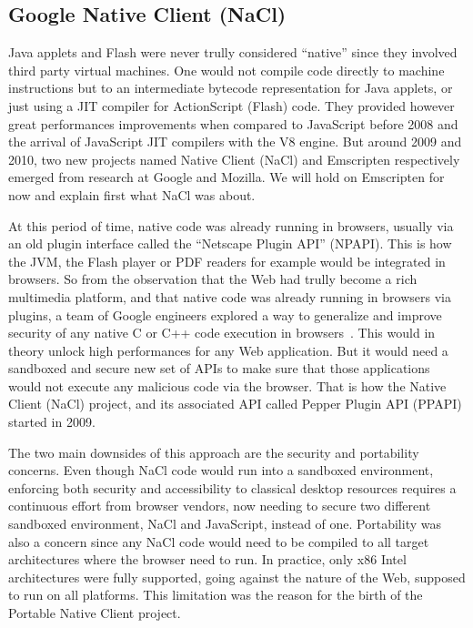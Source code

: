 \subsection{Google Native Client (NaCl)}%
\label{sub:nacl}

Java applets and Flash were never trully considered ``native''
since they involved third party virtual machines.
One would not compile code directly to machine instructions
but to an intermediate bytecode representation for Java applets,
or just using a JIT compiler for ActionScript (Flash) code.
They provided however great performances improvements when compared
to JavaScript before 2008 and the arrival of JavaScript JIT compilers with the V8 engine.
But around 2009 and 2010, two new projects named Native Client (NaCl) and Emscripten
respectively emerged from research at Google and Mozilla.
We will hold on Emscripten for now and explain first what NaCl was about.

At this period of time, native code was already running in browsers,
usually via an old plugin interface called the ``Netscape Plugin API'' (NPAPI).
This is how the JVM, the Flash player or PDF readers for example
would be integrated in browsers.
So from the observation that the Web had trully become a rich multimedia platform,
and that native code was already running in browsers via plugins,
a team of Google engineers explored a way to generalize and improve security
of any native C or C++ code execution in browsers~\cite{yee2009native}.
This would in theory unlock high performances for any Web application.
But it would need a sandboxed and secure new set of APIs
to make sure that those applications would not execute any malicious code via the browser.
That is how the Native Client (NaCl) project,
and its associated API called Pepper Plugin API (PPAPI) started in 2009.

The two main downsides of this approach are the security and portability concerns.
Even though NaCl code would run into a sandboxed environment,
enforcing both security and accessibility to classical desktop resources
requires a continuous effort from browser vendors,
now needing to secure two different sandboxed environment,
NaCl and JavaScript, instead of one.
Portability was also a concern since any NaCl code would need to be compiled
to all target architectures where the browser need to run.
In practice, only x86 Intel architectures were fully supported,
going against the nature of the Web, supposed to run on all platforms.
This limitation was the reason for the birth of the Portable Native Client project.

